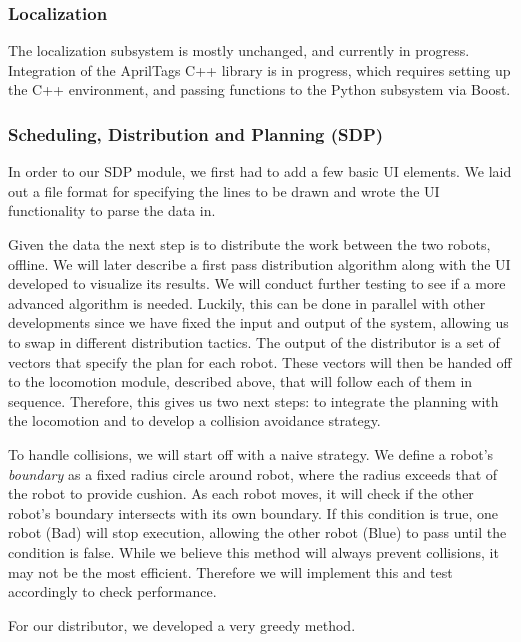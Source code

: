 \subsubsection{Localization}
The localization subsystem is mostly unchanged, and currently in progress. Integration of the AprilTags C++ library is in progress, which requires setting up the C++ environment, and passing functions to the Python subsystem via Boost.

\subsubsection{Scheduling, Distribution and Planning (SDP)}

In order to our SDP module, we first had to add a few basic UI elements. We laid out a file format for specifying the lines to be drawn and wrote the UI functionality to parse the data in.

Given the data the next step is to distribute the work between the two robots, offline. We will later describe a first pass distribution algorithm along with the UI developed to visualize its results. We will conduct further testing to see if a more advanced algorithm is needed. Luckily, this can be done in parallel with other developments since we have fixed the input and output of the system, allowing us to swap in different distribution tactics. The output of the distributor is a set of vectors that specify the plan for each robot. These vectors will then be handed off to the locomotion module, described above, that will follow each of them in sequence. Therefore, this gives us two next steps: to integrate the planning with the locomotion and to develop a collision avoidance strategy.

To handle collisions, we will start off with a naive strategy. We define a robot's \textit{boundary} as a fixed radius circle around robot, where the radius exceeds that of the robot to provide cushion. As each robot moves, it will check if the other robot's boundary intersects with its own boundary. If this condition is true, one robot (Bad) will stop execution, allowing the other robot (Blue) to pass until the condition is false. While we believe this method will always prevent collisions, it may not be the most efficient. Therefore we will implement this and test accordingly to check performance.

For our distributor, we developed a very greedy method.
